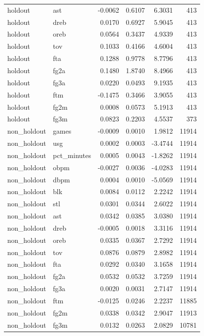 \begin{table}
\begin{tabular}{llrrrr}
holdout & ast & -0.0062 & 0.6107 & 6.3031 & 413 \\
holdout & dreb & 0.0170 & 0.6927 & 5.9045 & 413 \\
holdout & oreb & 0.0564 & 0.3437 & 4.9339 & 413 \\
holdout & tov & 0.1033 & 0.4166 & 4.6004 & 413 \\
holdout & fta & 0.1288 & 0.9778 & 8.7796 & 413 \\
holdout & fg2a & 0.1480 & 1.8740 & 8.4966 & 413 \\
holdout & fg3a & 0.0220 & 0.0493 & 9.1935 & 413 \\
holdout & ftm & -0.1475 & 0.3466 & 3.9055 & 413 \\
holdout & fg2m & 0.0008 & 0.0573 & 5.1913 & 413 \\
holdout & fg3m & 0.0823 & 0.2203 & 4.5537 & 373 \\
non\_holdout & games & -0.0009 & 0.0010 & 1.9812 & 11914 \\
non\_holdout & usg & 0.0002 & 0.0003 & -3.4744 & 11914 \\
non\_holdout & pct\_minutes & 0.0005 & 0.0043 & -1.8262 & 11914 \\
non\_holdout & obpm & -0.0027 & 0.0036 & -4.0283 & 11914 \\
non\_holdout & dbpm & 0.0004 & 0.0010 & -5.0569 & 11914 \\
non\_holdout & blk & 0.0084 & 0.0112 & 2.2242 & 11914 \\
non\_holdout & stl & 0.0301 & 0.0344 & 2.6022 & 11914 \\
non\_holdout & ast & 0.0342 & 0.0385 & 3.0380 & 11914 \\
non\_holdout & dreb & -0.0005 & 0.0018 & 3.3116 & 11914 \\
non\_holdout & oreb & 0.0335 & 0.0367 & 2.7292 & 11914 \\
non\_holdout & tov & 0.0876 & 0.0879 & 2.8982 & 11914 \\
non\_holdout & fta & 0.0292 & 0.0340 & 3.1658 & 11914 \\
non\_holdout & fg2a & 0.0532 & 0.0532 & 3.7259 & 11914 \\
non\_holdout & fg3a & 0.0020 & 0.0031 & 2.7147 & 11914 \\
non\_holdout & ftm & -0.0125 & 0.0246 & 2.2237 & 11885 \\
non\_holdout & fg2m & 0.0338 & 0.0342 & 2.9047 & 11913 \\
non\_holdout & fg3m & 0.0132 & 0.0263 & 2.0829 & 10781 \\
\bottomrule
\end{tabular}
\end{table}

